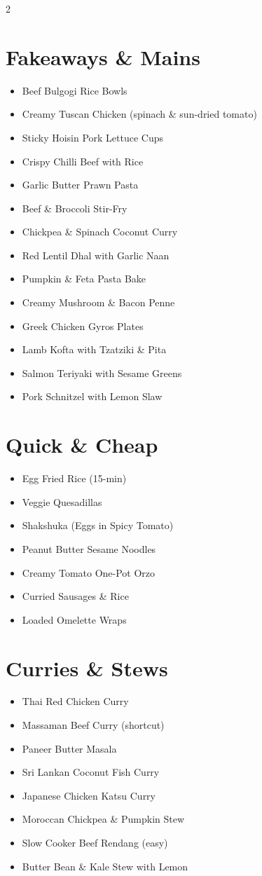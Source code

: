 \documentclass[13pt,a4paper]{book}
\begin{document}
\newpage
\begin{multicols}{2}

\section*{Fakeaways \& Mains}
\begin{itemize}
\item Beef Bulgogi Rice Bowls
\item Creamy Tuscan Chicken (spinach \& sun-dried tomato)
\item Sticky Hoisin Pork Lettuce Cups
\item Crispy Chilli Beef with Rice
\item Garlic Butter Prawn Pasta
\item Beef \& Broccoli Stir-Fry
\item Chickpea \& Spinach Coconut Curry
\item Red Lentil Dhal with Garlic Naan
\item Pumpkin \& Feta Pasta Bake
\item Creamy Mushroom \& Bacon Penne
\item Greek Chicken Gyros Plates
\item Lamb Kofta with Tzatziki \& Pita
\item Salmon Teriyaki with Sesame Greens
\item Pork Schnitzel with Lemon Slaw
\end{itemize}

\section*{Quick \& Cheap}
\begin{itemize}
\item Egg Fried Rice (15-min)
\item Veggie Quesadillas
\item Shakshuka (Eggs in Spicy Tomato)
\item Peanut Butter Sesame Noodles
\item Creamy Tomato One-Pot Orzo
\item Curried Sausages \& Rice
\item Loaded Omelette Wraps
\end{itemize}

\section*{Curries \& Stews}
\begin{itemize}
\item Thai Red Chicken Curry
\item Massaman Beef Curry (shortcut)
\item Paneer Butter Masala
\item Sri Lankan Coconut Fish Curry
\item Japanese Chicken Katsu Curry
\item Moroccan Chickpea \& Pumpkin Stew
\item Slow Cooker Beef Rendang (easy)
\item Butter Bean \& Kale Stew with Lemon
\end{itemize}


\end{multicols}
\end{document}
